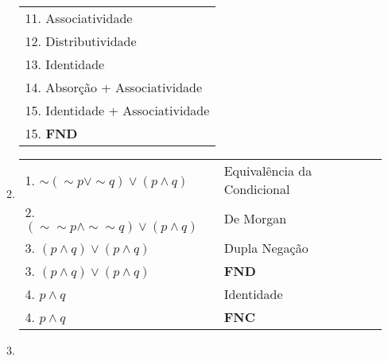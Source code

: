 \documentclass[12pt, a4paper,final]{article}
\begin{document}
\begin{enumerate}
\begin{enumerate}[label=(\alph*), leftmargin = 5mm]
\begin{tabular}{l}
                    11. Associatividade \\
                    12. Distributividade \\
                    13. Identidade \\
                    14. Absorção + Associatividade \\
                    15. Identidade + Associatividade \\
                    15. \textbf{FND} \\
                \end{tabular}
            
            \item 
            
                \begin{tabular}{ll}
                    1. $\sim(\sim p \vee \sim q) \vee (p \wedge q)$ & Equivalência da Condicional \\
                    2. $(\sim \sim p \wedge \sim \sim q) \vee (p \wedge q)$ & De Morgan \\
                    3. $(p \wedge q) \vee (p \wedge q)$ & Dupla Negação \\
                    3. $(p \wedge q) \vee (p \wedge q)$ & \textbf{FND} \\
                    4. $p \wedge q$ & Identidade \\
                    4. $p \wedge q$ & \textbf{FNC} \\
                \end{tabular}
            
            \item 
            

\end{enumerate}
\end{enumerate}
\end{document}
